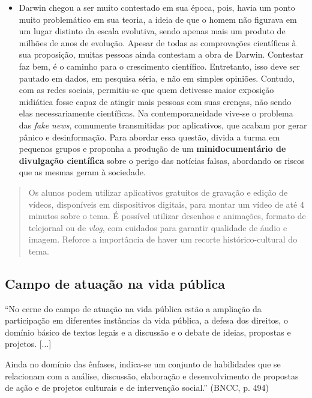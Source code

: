 \documentclass[12pt]{extarticle}
\begin{document}
\begin{itemize} \item Darwin chegou a ser muito contestado em sua época, pois,
      havia um ponto muito problemático em sua teoria, a ideia de que o homem
      não figurava em um lugar distinto da escala evolutiva, sendo apenas mais
      um produto de milhões de anos de evolução. Apesar de todas as
      comprovações científicas à sua proposição, muitas pessoas ainda contestam
      a obra de Darwin. Contestar faz bem, é o caminho para o crescimento
      científico. Entretanto, isso deve ser pautado em dados, em pesquisa
      séria, e não em simples opiniões. Contudo, com as redes sociais,
      permitiu-se que quem detivesse maior exposição midiática fosse capaz de
      atingir mais pessoas com suas crenças, não sendo elas necessariamente
      científicas. Na contemporaneidade vive-se o problema das \emph{fake
      news}, comumente transmitidas por aplicativos, que acabam por gerar
      pânico e desinformação. Para abordar essa questão, divida a turma em
      pequenos grupos e proponha a produção de um \textbf{minidocumentário de
      divulgação científica} sobre o perigo das notícias falsas, abordando os
      riscos que as mesmas geram à sociedade.  \end{itemize}

\begin{quote} Os alunos podem utilizar aplicativos gratuitos de gravação
  e edição de vídeos, disponíveis em dispositivos digitais, para montar um
  vídeo de até 4 minutos sobre o tema. É possível utilizar desenhos
  e animações, formato de telejornal ou de \emph{vlog}, com cuidados para
  garantir qualidade de áudio e imagem. Reforce a importância de haver um
recorte histórico-cultural do tema.  \end{quote}

\subsection{Campo de atuação na vida pública}

``No cerne do campo de atuação na vida pública estão a ampliação da
participação em diferentes instâncias da vida pública, a defesa dos direitos,
o domínio básico de textos legais e a discussão e o debate de ideias, propostas
e projetos. {[}...{]}

Ainda no domínio das ênfases, indica-se um conjunto de habilidades que se
relacionam com a análise, discussão, elaboração e desenvolvimento de propostas
de ação e de projetos culturais e de intervenção social.'' (BNCC, p. 494)
\end{document}

